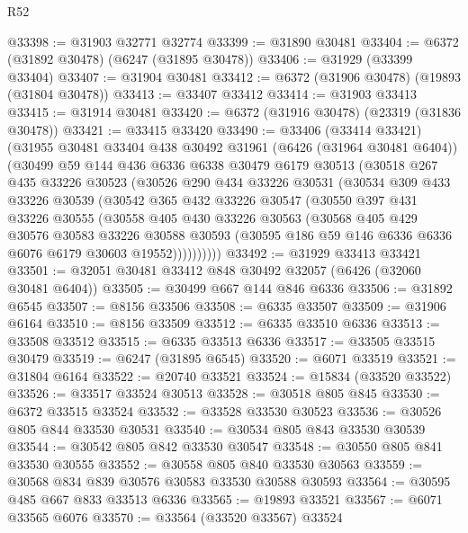 \begin{lexlean}{R52}
\begin{coremodule}
@33398 := @31903 @32771 @32774
@33399 := @31890 @30481
@33404 := @6372 (@31892 @30478) (@6247 (@31895 @30478))
@33406 := @31929 (@33399 @33404)
@33407 := @31904 @30481
@33412 := @6372 (@31906 @30478) (@19893 (@31804 @30478))
@33413 := @33407 @33412
@33414 := @31903 @33413
@33415 := @31914 @30481
@33420 := @6372 (@31916 @30478) (@23319 (@31836 @30478))
@33421 := @33415 @33420
@33490 := @33406
    (@33414 @33421)
    (@31955
      @30481
      @33404
      @438
      @30492
      @31961
      (@6426 (@31964 @30481 @6404))
      (@30499
        @59
        @144
        @436
        @6336
        @6338
        @30479
        @6179
        @30513
        (@30518
          @267
          @435
          @33226
          @30523
          (@30526
            @290
            @434
            @33226
            @30531
            (@30534
              @309
              @433
              @33226
              @30539
              (@30542
                @365
                @432
                @33226
                @30547
                (@30550
                  @397
                  @431
                  @33226
                  @30555
                  (@30558
                    @405
                    @430
                    @33226
                    @30563
                    (@30568
                      @405
                      @429
                      @30576
                      @30583
                      @33226
                      @30588
                      @30593
                      (@30595 @186 @59 @146 @6336 @6336 @6076 @6179 @30603 @19552))))))))))
@33492 := @31929 @33413 @33421
@33501 := @32051 @30481 @33412 @848 @30492 @32057 (@6426 (@32060 @30481 @6404))
@33505 := @30499 @667 @144 @846 @6336
@33506 := @31892 @6545
@33507 := @8156 @33506
@33508 := @6335 @33507
@33509 := @31906 @6164
@33510 := @8156 @33509
@33512 := @6335 @33510 @6336
@33513 := @33508 @33512
@33515 := @6335 @33513 @6336
@33517 := @33505 @33515 @30479
@33519 := @6247 (@31895 @6545)
@33520 := @6071 @33519
@33521 := @31804 @6164
@33522 := @20740 @33521
@33524 := @15834 (@33520 @33522)
@33526 := @33517 @33524 @30513
@33528 := @30518 @805 @845
@33530 := @6372 @33515 @33524
@33532 := @33528 @33530 @30523
@33536 := @30526 @805 @844 @33530 @30531
@33540 := @30534 @805 @843 @33530 @30539
@33544 := @30542 @805 @842 @33530 @30547
@33548 := @30550 @805 @841 @33530 @30555
@33552 := @30558 @805 @840 @33530 @30563
@33559 := @30568 @834 @839 @30576 @30583 @33530 @30588 @30593
@33564 := @30595 @485 @667 @833 @33513 @6336
@33565 := @19893 @33521
@33567 := @6071 @33565 @6076
@33570 := @33564 (@33520 @33567) @33524

\end{coremodule}
\end{lexlean}
